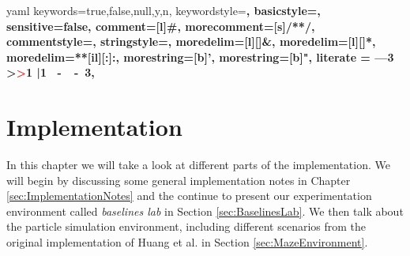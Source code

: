 
\newcommand\YAMLcolonstyle{\color{black}\bfseries\small}
\newcommand\YAMLkeystyle{\color{black}\mdseries\small}
\newcommand\YAMLvaluestyle{\color{green}\mdseries\small}

\makeatletter

\newcommand\language@yaml{yaml}

\expandafter\expandafter\expandafter\lstdefinelanguage
\expandafter{\language@yaml}
{
  keywords={true,false,null,y,n},
  keywordstyle=\color{darkgray}\bfseries,
  basicstyle=\YAMLkeystyle,                                 %
  sensitive=false,
  comment=[l]{\#},
  morecomment=[s]{/*}{*/},
  commentstyle=\color{purple}\ttfamily,
  stringstyle=\YAMLvaluestyle\ttfamily,
  moredelim=[l][\color{orange}]{\&},
  moredelim=[l][\color{magenta}]{*},
  moredelim=**[il][\YAMLcolonstyle{:}\YAMLvaluestyle]{:},   %
  morestring=[b]',
  morestring=[b]",
  literate =    {---}{{\ProcessThreeDashes}}3
                {>}{{\textcolor{red}\textgreater}}1     
                {|}{{\textcolor{red}\textbar}}1 
                {\ -\ }{{\mdseries\ -\ }}3,
}

\lst@AddToHook{EveryLine}{\ifx\lst@language\language@yaml\YAMLkeystyle\fi}
\makeatother

\newcommand\ProcessThreeDashes{\llap{\color{cyan}\mdseries-{-}-}}




\lstset{style=mystyle}

\chapter{Implementation} \label{chp:Implementation}
In this chapter we will take a look at different parts of the implementation. We will begin by discussing some general implementation notes in Chapter \ref{sec:ImplementationNotes} and the continue to present our experimentation environment called \textit{baselines lab} in Section \ref{sec:BaselinesLab}. We then talk about the particle simulation environment, including different scenarios from the original implementation of Huang et al. in Section \ref{sec:MazeEnvironment}.

